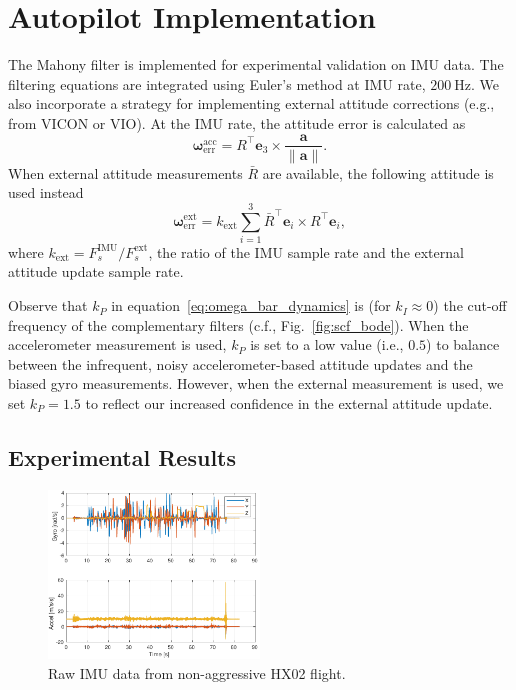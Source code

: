 \documentclass[a4paper]{article}
\begin{document}
\section*{Autopilot Implementation}
The Mahony filter is implemented for experimental validation on IMU data.
The filtering equations are integrated using Euler's method at IMU rate, $\SI{200}{\Hz}$.
We also incorporate a strategy for implementing external attitude corrections (e.g., from VICON or VIO).
At the IMU rate, the attitude error is calculated as
\begin{equation}
\bm{\omega}_\text{err}^\text{acc} = R^\top \bm{e}_3 \times \frac{\bm{a}}{\|\bm{a}\|}.
\end{equation}
When external attitude measurements $\bar{R}$ are available, the following attitude is used instead
\begin{equation}
\bm{\omega}_\text{err}^\text{ext} = k_\text{ext}\sum_{i=1}^3 \bar{R}^\top\bm{e}_i\times R^\top\bm{e}_i,
\end{equation}
where $k_\text{ext} = F_s^\text{IMU}/F_s^\text{ext}$, the ratio of the IMU sample rate and the external attitude update sample rate.

Observe that $k_P$ in equation~\eqref{eq:omega_bar_dynamics} is (for $k_I\approx0$) the cut-off frequency of the complementary filters (c.f., Fig.~\ref{fig:scf_bode}).
When the accelerometer measurement is used, $k_P$ is set to a low value (i.e., $0.5$) to balance between the infrequent, noisy accelerometer-based attitude updates and the biased gyro measurements.
However, when the external measurement is used, we set $k_P=1.5$ to reflect our increased confidence in the external attitude update.

\subsection*{Experimental Results}

\begin{figure}[H]
  \centering
  \includegraphics[width=0.5\textwidth]{rawimu.pdf}
  \caption{Raw IMU data from non-aggressive HX02 flight.}
  \label{fig:rawimu}
\end{figure}
\end{document}
